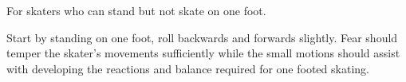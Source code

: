 For skaters who can stand but not skate on one foot.  

Start by standing on one foot, roll backwards and forwards slightly. Fear should temper the skater's movements sufficiently while the small motions should assist with developing the reactions and balance required for one footed skating.
